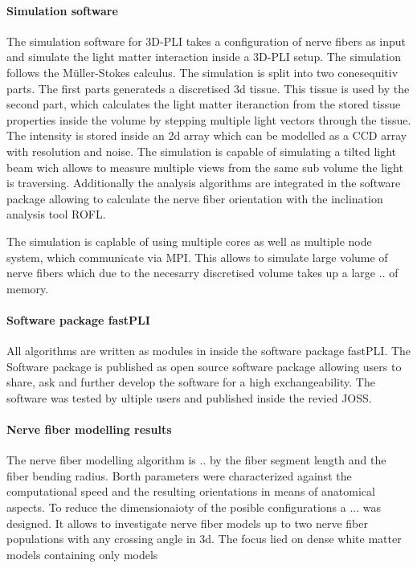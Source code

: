 \paragraph{Simulation software}
% 
The simulation software for \ac{3D-PLI} takes a configuration of nerve fibers as input and simulate the light matter interaction inside a \ac{3D-PLI} setup.
The simulation follows the M\"{u}ller-Stokes calculus.
The simulation is split into two conesequitiv parts.
The first parts generateds a discretised 3d tissue.
This tissue is used by the second part, which calculates the light matter iteranction from the stored tissue properties inside the volume by stepping multiple light vectors through the tissue.
The intensity is stored inside an 2d array which can be modelled as a \ac{CCD} array with resolution and noise.
The simulation is capable of simulating a tilted light beam wich allows to measure multiple views from the same sub volume the light is traversing.
Additionally the analysis algorithms are integrated in the software package allowing to calculate the nerve fiber orientation with the inclination analysis tool \ac{ROFL}.
\par
% 
The simulation is caplable of using multiple cores as well as multiple node system, which communicate via \ac{MPI}.
This allows to simulate large volume of nerve fibers which due to the necesarry discretised volume takes up a large .. of memory.
% 
% 
% 
\paragraph{Software package \acs{fastPLI}}
All algorithms are written as modules in \python{} inside the software package \ac{fastPLI}.
The Software package is published as open source software package allowing users to share, ask and further develop the software for a high exchangeability. 
The software was tested by ultiple users and published inside the revied \ac{JOSS}.
% 
% 
% 
\paragraph{Nerve fiber modelling results}
% 
The nerve fiber modelling algorithm is .. by the fiber segment length and the fiber bending radius.
Borth parameters were characterized against the computational speed and the resulting orientations in means of anatomical aspects.
To reduce the dimensionaioty of the posible configurations a ... was designed.
It allows to investigate nerve fiber models up to two nerve fiber populations with any crossing angle in 3d.
The focus lied on dense white matter models containing only models

